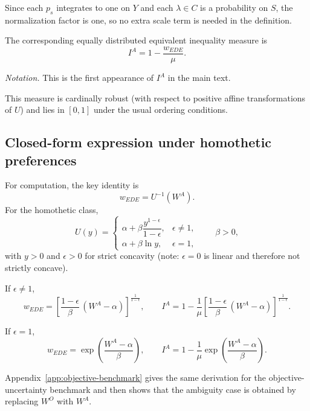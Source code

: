 \documentclass[../../../00-main.tex]{subfiles}
\begin{document}
\par Since each $p_s$ integrates to one on $Y$ and each $\lambda\in C$ is a probability on $S$, the normalization factor is one, so no extra scale term is needed in the definition.

\par The corresponding equally distributed equivalent inequality measure is
\[
I^{A} = 1 - \frac{w_{EDE}}{\mu}.
\]

\par \textit{Notation.} This is the first appearance of $I^{A}$ in the main text.

\par This measure is cardinally robust (with respect to positive affine transformations of $U$) and lies in $[0,1]$ under the usual ordering conditions.

\subsection{Closed-form expression under homothetic preferences}

\par For computation, the key identity is
\[
w_{EDE} = U^{-1}(W^{A}).
\]
For the homothetic class,
\[
U(y)=
\begin{cases}
\alpha + \beta\dfrac{y^{1-\epsilon}}{1-\epsilon}, & \epsilon\neq 1,\\
\alpha + \beta\ln y, & \epsilon = 1,
\end{cases}
\qquad \beta>0,
\]
with $y>0$ and $\epsilon>0$ for strict concavity (note: $\epsilon=0$ is linear and therefore not strictly concave).

\par If $\epsilon\neq 1$,
\[
w_{EDE} = \left[\frac{1-\epsilon}{\beta}\,(W^{A}-\alpha)\right]^{\frac{1}{1-\epsilon}},
\qquad
I^{A} = 1 - \frac{1}{\mu}\left[\frac{1-\epsilon}{\beta}\,(W^{A}-\alpha)\right]^{\frac{1}{1-\epsilon}}.
\]

\par If $\epsilon=1$,
\[
w_{EDE} = \exp\!\left(\frac{W^{A}-\alpha}{\beta}\right),
\qquad
I^{A} = 1 - \frac{1}{\mu}\exp\!\left(\frac{W^{A}-\alpha}{\beta}\right).
\]

\par Appendix~\ref{app:objective-benchmark} gives the same derivation for the objective-uncertainty benchmark and then shows that the ambiguity case is obtained by replacing $W^{O}$ with $W^{A}$.
\end{document}
